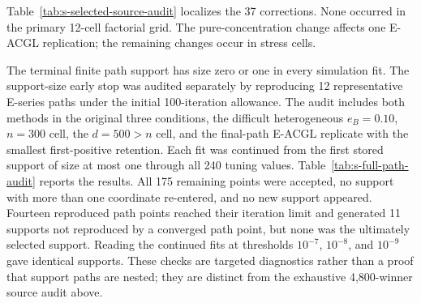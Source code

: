 \documentclass[preprint,12pt,authoryear]{elsarticle}
\begin{document}
Table~\ref{tab:s-selected-source-audit} localizes the 37 corrections. None
occurred in the primary 12-cell factorial grid. The pure-concentration change
affects one E-ACGL replication; the remaining changes occur in stress cells.

\begin{table}[t]
\centering
\small
\caption{Selected-source convergence corrections. ``Affected'' counts
archived winners whose penalized source reached the 100-iteration limit;
``support changed'' and ``$q$ changed'' compare the corrected converged-source
winner with the archived winner.}
\label{tab:s-selected-source-audit}
\end{table}

The terminal finite path support has size zero or one in every simulation fit.
The support-size early stop was audited separately by reproducing 12
representative E-series paths under the initial 100-iteration allowance. The
audit includes both methods in the original three conditions,
the difficult heterogeneous $e_B=0.10$, $n=300$ cell, the $d=500>n$ cell, and
the final-path E-ACGL replicate with the smallest first-positive retention.
Each fit was continued from the first stored support of size at most one
through all 240 tuning values. Table~\ref{tab:s-full-path-audit} reports the
results. All 175 remaining points were accepted, no support with more than one
coordinate re-entered, and no new support appeared. Fourteen reproduced path
points reached their iteration limit and generated 11 supports not reproduced
by a converged path point, but none was the ultimately selected support.
Reading the continued fits at thresholds $10^{-7}$, $10^{-8}$, and $10^{-9}$
gave identical supports. These checks are targeted diagnostics rather than a
proof that support paths are nested; they are distinct from the exhaustive
4,800-winner source audit above.
\end{document}
